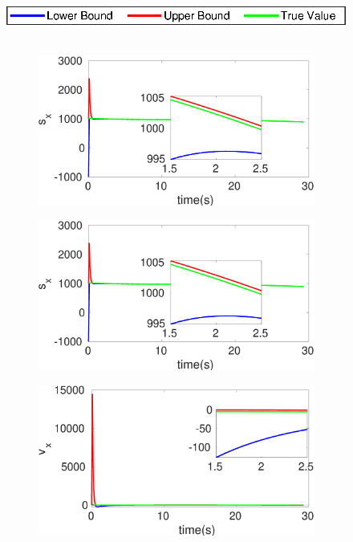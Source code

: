 \begin{figure}[!h]
\hspace*{\fill} \includegraphics[scale=0.8]{figures/legend}\\\\
\begin{subfigure}{.5\linewidth}
\centering
\includegraphics[width=\linewidth]{figures/HInf/s3pmHInfs_x}
\end{subfigure}
\begin{subfigure}{.5\linewidth}
\centering
\includegraphics[width=\linewidth]{figures/HInf/s3pmHInfs_x}
\end{subfigure}
\begin{subfigure}{.5\linewidth}
\centering
\includegraphics[width=\linewidth]{figures/HInf/s3pmHInfv_x}

\end{subfigure}
\end{figure}

